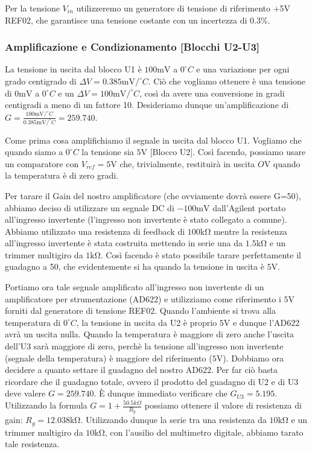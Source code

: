 Per la tensione $V_{in}$ utilizzeremo un generatore di tensione di riferimento +5\si{\volt} REF02, che garantisce una tensione costante con un incertezza di $0.3\%$.

\subsubsection{Amplificazione e Condizionamento [Blocchi U2-U3]}
La tensione in uscita dal blocco U1 è $100 \si{\milli\volt}$ a $0^{\circ}C$ e una variazione per ogni grado centigrado di $\Delta V=0.385\si{\milli\volt}/^{\circ}C$. Ciò che vogliamo ottenere è una tensione di $0 \si{\milli\volt}$ a $0^{\circ}C$ e un $\Delta V=100\si{\milli\volt}/^{\circ}C$, così da avere una conversione in gradi centigradi a meno di un fattore 10. Desideriamo dunque un'amplificazione di $G=\frac{100\si{\milli\volt}/^{\circ}C}{0.385\si{\milli\volt}/^{\circ}C}=259.740$. 


Come prima cosa amplifichiamo il segnale in uscita dal blocco U1. Vogliamo che quando siamo a $0^{\circ}C$ la tensione sia $5\si{\volt}$ [Blocco U2]. Così facendo, possiamo usare un comparatore con $V_{ref}=5\si{\volt}$ che, trivialmente, restituirà in uscita $O\si{\volt}$ quando la temperatura è di zero gradi. 

Per tarare il Gain del nostro amplificatore (che ovviamente dovrà essere G=50), abbiamo deciso di utilizzare un segnale DC di $-100\si{\milli\volt}$ dall'Agilent portato all'ingresso invertente (l'ingresso non invertente è stato collegato a comune). Abbiamo utilizzato una resistenza di feedback di $100\si{\kilo\ohm}$ mentre la resistenza all'ingresso invertente è stata costruita mettendo in serie una da $1.5\si{\kilo\ohm}$ e un trimmer multigiro da $1\si{\kilo\ohm}$. Così facendo è stato possibile tarare perfettamente il guadagno a 50, che evidentemente si ha quando la tensione in uscita è $5\si{\volt}$. 

Portiamo ora tale segnale amplificato all'ingresso non invertente di un amplificatore per strumentazione (AD622) e utilizziamo come riferimento i $5\si{\volt}$ forniti dal generatore di tensione REF02. Quando l'ambiente si trova alla temperatura di $0^{\circ}C$, la tensione in uscita da U2 è proprio $5\si{\volt}$ e dunque l'AD622 avrà un uscita nulla. Quando la temperatura è maggiore di zero anche l'uscita dell'U3 sarà maggiore di zero, perchè la tensione all'ingresso non invertente (segnale della temperatura) è maggiore del riferimento ($5\si{\volt}$). Dobbiamo ora decidere a quanto settare il guadagno del nostro AD622. Per far ciò basta ricordare che il guadagno totale, ovvero il prodotto del guadagno di U2 e di U3 deve valere $G=259.740$. È dunque immediato verificare che $G_{U3}=5.195$. Utilizzando la formula $G=1+\frac{50.5k\Omega}{R_g}$ possiamo ottenere il valore di resistenza di gain: $R_g=12.038\si{\kilo\ohm}$. Utilizzando dunque la serie tra una resistenza da $10\si{\kilo\ohm}$ e un trimmer multigiro da $10\si{\kilo\ohm}$, con l'ausilio del multimetro digitale, abbiamo tarato tale resistenza. 

